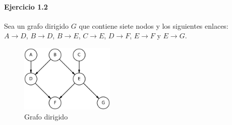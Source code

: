 \documentclass[12pt,a4paper]{article}
\renewcommand{\labelenumi}{(\alph{enumi})}
\begin{document}
\newpage
\renewcommand{\labelenumi}{\arabic{enumi}.}
\renewcommand{\labelenumii}{(\alph{enumii})}
\paragraph{Ejercicio 1.2}
Sea un grafo dirigido $G$ que contiene siete nodos y los siguientes enlaces: \\
$A \to D$, $B \to D$, $B \to E$, $C \to E$, $D \to F$, $E \to F$ y $E \to G$.
\begin{figure}[h!]
    \centering
    \includegraphics[width=0.4\textwidth]{graph2.png}
    \caption{Grafo dirigido}
    \label{fig:ejercicio2}
\end{figure}
\end{document}
